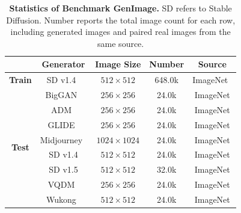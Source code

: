 \documentclass[lettersize,journal]{IEEEtran}
\begin{document}
\begin{table}[H]
\caption{\textbf{Statistics of Benchmark GenImage.} SD refers to Stable Diffusion. Number reports the total image count for each row, including generated images and paired real images from the same source.}
\label{tab:appendix_genimage_statistics}
\centering
\small
\renewcommand{\arraystretch}{1.04}
\setlength{\tabcolsep}{12pt}
\begin{tabular}{@{}c|cccc@{}}
\toprule
& \textbf{Generator} & \textbf{Image Size} & \textbf{Number} & \textbf{Source} \\
\midrule
\textbf{Train} & SD v1.4~\cite{rombach2022ldm} & $512\times512$ & 648.0k & ImageNet~\cite{deng2009imagenet} \\
\midrule
\multirow{8}{*}{\textbf{Test}}
& BigGAN~\cite{brock2019biggan} & $256\times256$ & 24.0k & ImageNet \\
& ADM~\cite{dhariwal2021diffusion} & $256\times256$ & 24.0k & ImageNet \\
& GLIDE~\cite{nichol2022glide} & $256\times256$ & 24.0k & ImageNet \\
& Midjourney~\cite{midjourney2023} & $1024\times1024$ & 24.0k & ImageNet \\
& SD v1.4 & $512\times512$ & 24.0k & ImageNet \\
& SD v1.5 & $512\times512$ & 32.0k & ImageNet \\
& VQDM~\cite{gu2022vqdm} & $256\times256$ & 24.0k & ImageNet \\
& Wukong~\cite{wukong2023} & $512\times512$ & 24.0k & ImageNet \\
\bottomrule
\end{tabular}
\end{table}
\end{document}
